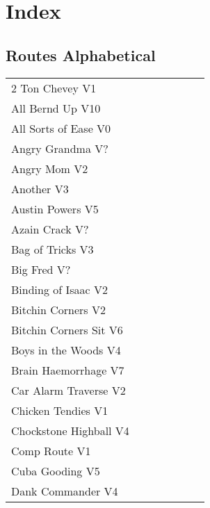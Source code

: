 \chapter{Index}
\lhead{\textcolor{\chapterColor}{\rule[-2pt]{\textwidth}{15pt}}}
\section{Routes Alphabetical}
\begin{center}
\begin{supertabular}{p{0.65\linewidth}r}
2 Ton Chevey V1 & \pageref{rt:2 Ton Chevey} \\
All Bernd Up V10 & \pageref{rt:All Bernd Up} \\
All Sorts of Ease V0 & \pageref{rt:All Sorts of Ease} \\
Angry Grandma V? & \pageref{rt:Angry Grandma} \\
Angry Mom V2 & \pageref{rt:Angry Mom} \\
Another V3 & \pageref{rt:Another} \\
Austin Powers V5 & \pageref{rt:Austin Powers} \\
Azain Crack V? & \pageref{rt:Azain Crack} \\
Bag of Tricks V3 & \pageref{vr:Bag of Tricks} \\
Big Fred V? & \pageref{rt:Big Fred} \\
Binding of Isaac V2 & \pageref{rt:Binding of Isaac} \\
Bitchin Corners V2 & \pageref{rt:Bitchin Corners} \\
Bitchin Corners Sit V6 & \pageref{vr:Bitchin Corners Sit} \\
Boys in the Woods V4 & \pageref{rt:Boys in the Woods} \\
Brain Haemorrhage V7 & \pageref{vr:Brain Haemorrhage} \\
Car Alarm Traverse V2 & \pageref{rt:Car Alarm Traverse} \\
Chicken Tendies V1 & \pageref{rt:Chicken Tendies} \\
Chockstone Highball V4 & \pageref{rt:Chockstone Highball} \\
Comp Route V1 & \pageref{rt:Comp Route} \\
Cuba Gooding V5 & \pageref{rt:Cuba Gooding} \\
Dank Commander V4 & \pageref{rt:Dank Commander} \\

\end{supertabular}
\end{center}
